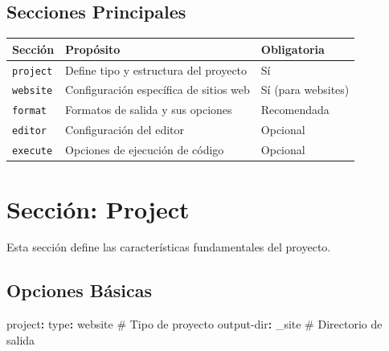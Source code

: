 \documentclass[
  doc,
  floatsintext,
  longtable,
  a4paper,
  nolmodern,
  notxfonts,
  notimes,
  12pt,
  colorlinks=true,linkcolor=blue,citecolor=blue,urlcolor=blue]{apa7}
\newenvironment{Shaded}{\begin{snugshade}}{\end{snugshade}}
\newcommand{\AttributeTok}[1]{\textcolor[rgb]{0.40,0.45,0.13}{#1}}
\newcommand{\CommentTok}[1]{\textcolor[rgb]{0.37,0.37,0.37}{#1}}
\newcommand{\FunctionTok}[1]{\textcolor[rgb]{0.28,0.35,0.67}{#1}}
\newcommand{\KeywordTok}[1]{\textcolor[rgb]{0.00,0.23,0.31}{\textbf{#1}}}
\newcounter{none} %
\begin{document}
\subsection{Secciones Principales}\label{secciones-principales}

{\def\LTcaptype{none} %
\begin{longtable}[]{@{}
  >{\raggedright\arraybackslash}p{}
  >{\raggedright\arraybackslash}p{}
  >{\raggedright\arraybackslash}p{}@{}}
\toprule\noalign{}
\begin{minipage}[b]{\linewidth}\raggedright
Sección
\end{minipage} & \begin{minipage}[b]{\linewidth}\raggedright
Propósito
\end{minipage} & \begin{minipage}[b]{\linewidth}\raggedright
Obligatoria
\end{minipage} \\
\midrule\noalign{}
\endhead
\bottomrule\noalign{}
\endlastfoot
\texttt{project} & Define tipo y estructura del proyecto & Sí \\
\texttt{website} & Configuración específica de sitios web & Sí (para
websites) \\
\texttt{format} & Formatos de salida y sus opciones & Recomendada \\
\texttt{editor} & Configuración del editor & Opcional \\
\texttt{execute} & Opciones de ejecución de código & Opcional \\
\end{longtable}
}

\section{Sección: Project}\label{secciuxf3n-project}

Esta sección define las características fundamentales del proyecto.

\subsection{Opciones Básicas}\label{opciones-buxe1sicas}

\begin{Shaded}
\begin{Highlighting}[]
\FunctionTok{project}\KeywordTok{:}
\AttributeTok{  }\FunctionTok{type}\KeywordTok{:}\AttributeTok{ website}\CommentTok{              \# Tipo de proyecto}
\AttributeTok{  }\FunctionTok{output{-}dir}\KeywordTok{:}\AttributeTok{ \_site}\CommentTok{          \# Directorio de salida}
\end{Highlighting}
\end{Shaded}
\end{document}
